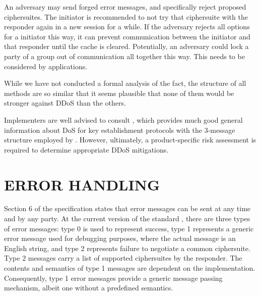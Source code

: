 \documentclass[runningheads]{llncs}
\begin{document}


An adversary may send forged error messages, and specifically reject proposed
ciphersuites.
%
The initiator is recommended to not try that ciphersuite with the responder
again in a new session for a while.
%
If the adversary rejects all options for a initiator this way, it can prevent
communication between the initiator and that responder until the cache is
cleared.
%
Potentially, an adversary could lock a party of a group out of communication all
together this way.
%
This needs to be considered by applications.
%

While we have not conducted a formal analysis of the fact, the structure of all
methods are so similar that it seems plausible that none of them would be
stronger against DDoS than the others.
%

Implementers are well advised to consult \cite{rfc8019}, which provides much
good general information about DoS for key establishment
protocols with the 3-message structure employed by \mEdhoc{}.
%
However, ultimately, a product-specific risk assessment is required to
determine appropriate DDoS mitigations.
%

\section{\uppercase{Error handling}}
\label{sec:errorHandling}
 Section 6 of the \mEdhoc{} specification\cite{draft-ietf-lake-edhoc-15} states that error messages can be sent at any time and by any party.
%
At the current version of the standard \cite{draft-ietf-lake-edhoc-15}, there are three types of error messages: type 0 is used to represent success, type 1 represents a generic error message used for debugging purposes, where the actual message is an English string, and type 2 represents failure to negotiate a common ciphersuite. Type 2 messages carry a list of supported ciphersuites by the responder.
%
The contents and semantics of type 1 messages are dependent on the implementation.
%
Consequently, type 1 error messages provide a generic message passing mechanism, albeit one without a predefined semantics.
\end{document}
